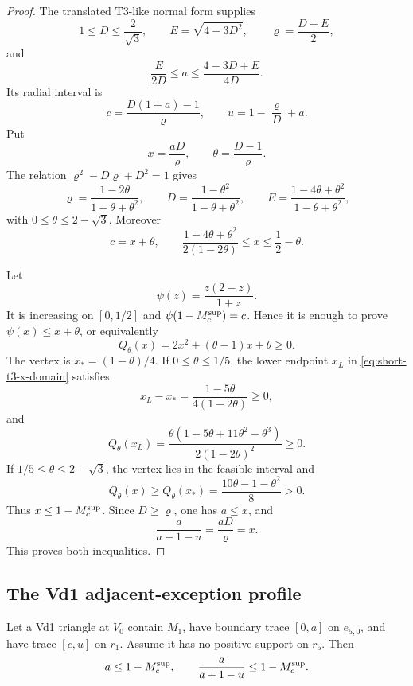 \begin{proof}
The translated T3-like normal form supplies
\[
 1\le D\le\frac2{\sqrt3},
 \qquad
 E=\sqrt{4-3D^2},
 \qquad
 \varrho=\frac{D+E}{2},
\]
and
\[
 \frac{E}{2D}\le a\le\frac{4-3D+E}{4D}.
\]
Its radial interval is
\[
 c=\frac{D(1+a)-1}{\varrho},
 \qquad
 u=1-\frac\varrho D+a.
\]
Put
\[
 x=\frac{aD}{\varrho},
 \qquad
 \theta=\frac{D-1}{\varrho}.
\]
The relation $\varrho^2-D\varrho+D^2=1$ gives
\[
 \varrho=\frac{1-2\theta}{1-\theta+\theta^2},
 \qquad
 D=\frac{1-\theta^2}{1-\theta+\theta^2},
 \qquad
 E=\frac{1-4\theta+\theta^2}{1-\theta+\theta^2},
\]
with $0\le\theta\le2-\sqrt3$.  Moreover
\begin{equation}
 c=x+\theta,
 \qquad
 \frac{1-4\theta+\theta^2}{2(1-2\theta)}
 \le x\le\frac12-\theta.
 \label{eq:short-t3-x-domain}
\end{equation}

Let
\[
 \psi(z)=\frac{z(2-z)}{1+z}.
\]
It is increasing on $[0,1/2]$ and
$\psi(1-M_c^{\rm sup})=c$.  Hence it is enough to prove
$\psi(x)\le x+\theta$, or equivalently
\[
 Q_\theta(x)=2x^2+(\theta-1)x+\theta\ge0.
\]
The vertex is $x_*=(1-\theta)/4$.  If $0\le\theta\le1/5$, the lower endpoint
$x_L$ in \eqref{eq:short-t3-x-domain} satisfies
\[
 x_L-x_*=\frac{1-5\theta}{4(1-2\theta)}\ge0,
\]
and
\[
 Q_\theta(x_L)
 =\frac{\theta(1-5\theta+11\theta^2-\theta^3)}
 {2(1-2\theta)^2}\ge0.
\]
If $1/5\le\theta\le2-\sqrt3$, the vertex lies in the feasible interval and
\[
 Q_\theta(x)\ge Q_\theta(x_*)
 =\frac{10\theta-1-\theta^2}{8}>0.
\]
Thus $x\le 1-M_c^{\rm sup}$.  Since $D\ge\varrho$, one has $a\le x$, and
\[
 \frac{a}{a+1-u}=\frac{aD}{\varrho}=x.
\]
This proves both inequalities.
\end{proof}

\subsection{The Vd1 adjacent-exception profile}

\begin{lemma}
\label{lem:short-vd1-rescuer-profile}
Let a Vd1 triangle at $V_0$ contain $M_1$, have boundary trace $[0,a]$ on
$e_{5,0}$, and have trace $[c,u]$ on $r_1$.  Assume it has no
positive support on $r_5$.  Then
\begin{equation}
 a\le 1-M_c^{\rm sup},
 \qquad
 \frac{a}{a+1-u}\le 1-M_c^{\rm sup}.
 \label{eq:short-vd1-profile}
\end{equation}
\end{lemma}


